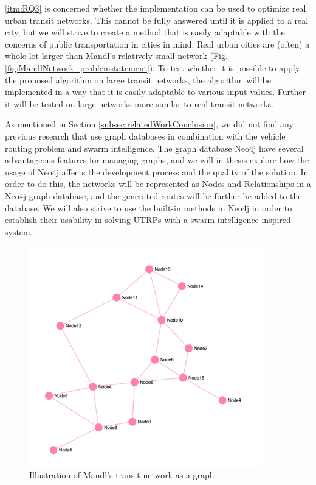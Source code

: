 \vref{itm:RQ3} is concerned whether the implementation can be used to optimize real urban transit networks. This cannot be fully answered until it is applied to a real city, but we will strive to create a method that is easily adaptable with the concerns of public transportation in cities in mind. Real urban cities are (often) a whole lot larger than Mandl's relatively small network (Fig. \vref{fig:MandlNetwork_problemstatement}). To  test whether it is possible to apply the proposed algorithm on large transit networks, the algorithm will be implemented in a way that it is easily adaptable to various input values. Further it will be tested on large networks more similar to real transit networks. 

As mentioned in Section \vref{subsec:relatedWorkConclusion}, we did not find any previous research that use graph databases in combination with the vehicle routing problem and swarm intelligence. The graph database Neo4j\citep{website:neo4j} have several advantageous features for managing graphs, and we will in thesis explore how the usage of Neo4j affects the development process and the quality of the solution.  In order to do this, the networks will be represented as Nodes and Relationships in a Neo4j graph database, and the generated routes will be further be added to the database. We will also strive to use the built-in methods in Neo4j in order to establish their usability in solving UTRPs with a swarm intelligence inspired system. 



\begin{figure}[H]
\begin{center}
  \includegraphics[width=4in]{assets/mandlnetwork_crop.png}
  \end{center}
  \caption{Illustration of Mandl's transit network as a graph}
  \label{fig:MandlNetwork_problemstatement} 
\end{figure}







